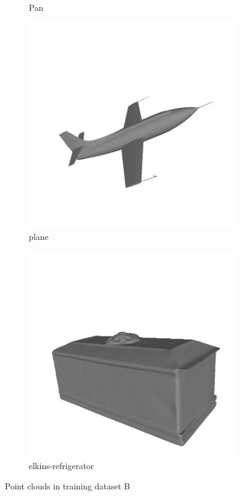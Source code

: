 \begin{figure}
\begin{subfigure}[b]{0.23\linewidth}
		\caption{Pan}
	\end{subfigure}
	\begin{subfigure}[b]{0.23\linewidth}
		\includegraphics[width=\linewidth]{./Figures/train-dataset/34.plane.png}
		\caption{plane}
	\end{subfigure}
	\begin{subfigure}[b]{0.23\linewidth}
		\includegraphics[width=\linewidth]{./Figures/train-dataset/35.elkins-refrigerator.png}
		\caption{elkins-refrigerator}
	\end{subfigure}
	

	
	
	\label{fig:dataset_b}
	\caption{Point clouds in training dataset B }
\end{figure}



